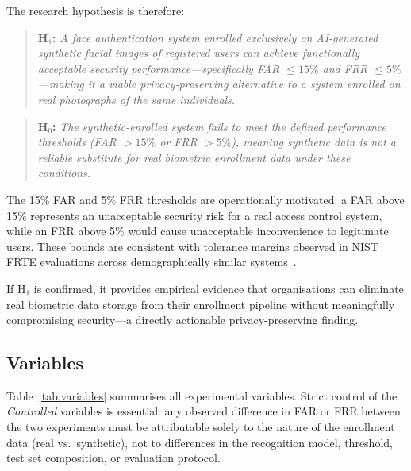 \documentclass[conference]{IEEEtran}
\begin{document}
The research hypothesis is therefore:

\begin{quote}
  \textbf{H$_1$:} \textit{A face authentication system
  enrolled exclusively on AI-generated synthetic facial images
  of registered users can achieve functionally acceptable
  security performance---specifically FAR $\leq 15\%$ and
  FRR $\leq 5\%$---making it a viable privacy-preserving
  alternative to a system enrolled on real photographs of
  the same individuals.}
\end{quote}

\begin{quote}
  \textbf{H$_0$:} \textit{The synthetic-enrolled system
  fails to meet the defined performance thresholds
  (FAR $> 15\%$ or FRR $> 5\%$), meaning synthetic data
  is not a reliable substitute for real biometric enrollment
  data under these conditions.}
\end{quote}

The 15\% FAR and 5\% FRR thresholds are operationally
motivated: a FAR above 15\% represents an unacceptable
security risk for a real access control system, while an
FRR above 5\% would cause unacceptable inconvenience to
legitimate users. These bounds are consistent with tolerance
margins observed in NIST FRTE evaluations across
demographically similar systems~\cite{nist2024}.

If H$_1$ is confirmed, it provides empirical evidence that
organisations can eliminate real biometric data storage from
their enrollment pipeline without meaningfully compromising
security---a directly actionable privacy-preserving finding.

\subsection{Variables}

Table~\ref{tab:variables} summarises all experimental
variables. Strict control of the \textit{Controlled}
variables is essential: any observed difference in FAR or FRR
between the two experiments must be attributable solely to
the nature of the enrollment data (real vs.\ synthetic), not
to differences in the recognition model, threshold, test set
composition, or evaluation protocol.
\end{document}
